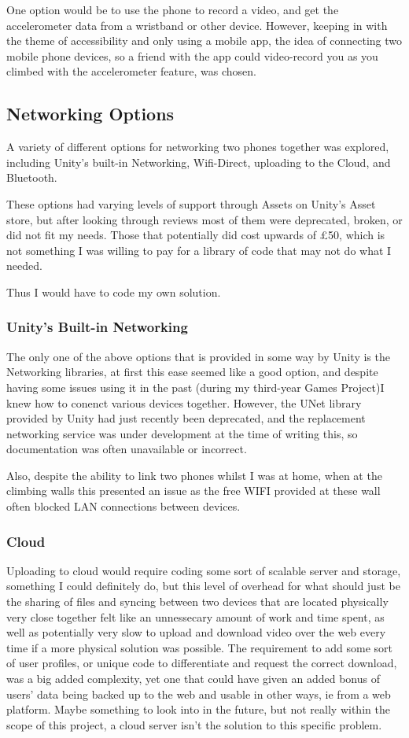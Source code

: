One option would be to use the phone to record a video, and get the accelerometer data from a wristband or other device.
However, keeping in with the theme of accessibility and only using a mobile app, the idea of connecting two mobile phone devices, so a friend with the app could video-record you as you climbed with the accelerometer feature, was chosen.


\subsection{Networking Options}
A variety of different options for networking two phones together was explored, including Unity's built-in Networking, Wifi-Direct, uploading to the Cloud, and Bluetooth.


These options had varying levels of support through Assets on Unity's Asset store, but after looking through reviews most of them were deprecated, broken, or did not fit my needs.
Those that potentially did cost upwards of £50, which is not something I was willing to pay for a library of code that may not do what I needed.

Thus I would have to code my own solution.

\subsubsection{Unity's Built-in Networking}
The only one of the above options that is provided in some way by Unity is the Networking libraries, at first this ease seemed like a good option, and despite having some issues using it in the past (during my third-year Games Project)I knew how to conenct various devices together.
However, the UNet library provided by Unity had just recently been deprecated, and the replacement networking service was under development at the time of writing this, so documentation was often unavailable or incorrect.

Also, despite the ability to link two phones whilst I was at home, when at the climbing walls this presented an issue as the free WIFI provided at these wall often blocked LAN connections between devices.

\subsubsection{Cloud}
Uploading to cloud would require coding some sort of scalable server and storage, something I could definitely do, but this level of overhead for what should just be the sharing of files and syncing between two devices that are located physically very close together felt like an unnessecary amount of work and time spent, as well as potentially very slow to upload and download video over the web every time if a more physical solution was possible.
The requirement to add some sort of user profiles, or unique code to differentiate and request the correct download, was a big added complexity, yet one that could have given an added bonus of users' data being backed up to the web and usable in other ways, ie from a web platform.
Maybe something to look into in the future, but not really within the scope of this project, a cloud server isn't the solution to this specific problem.

